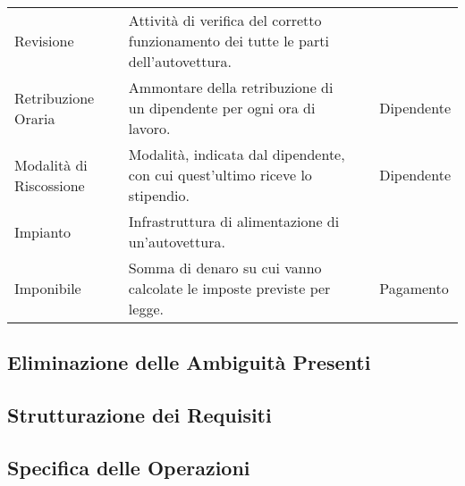 \begin{longtable}{| p{2.5cm} | p{4.5cm} | p{2cm} | p{2.5cm} |}
				&& \\ \hline
				Revisione & 
				Attività di verifica del corretto funzionamento dei tutte le parti dell’autovettura. 
				&& \\ \hline
				Retribuzione Oraria & 
				Ammontare della retribuzione di un dipendente per ogni ora di lavoro. && 
				Dipendente
				\\ \hline
				Modalità di Riscossione &
				Modalità, indicata dal dipendente, con cui quest’ultimo riceve lo stipendio. &&
				Dipendente 
				\\ \hline
				Impianto & 
				Infrastruttura di alimentazione di un’autovettura.
				&&\\ \hline
				Imponibile &
				Somma di denaro su cui vanno calcolate le imposte previste per legge. &&
				Pagamento 
				\\ \hline
				
		\end{longtable}
		
	\subsection{Eliminazione delle Ambiguità Presenti}
	\subsection{Strutturazione dei Requisiti}
	\subsection{Specifica delle Operazioni}